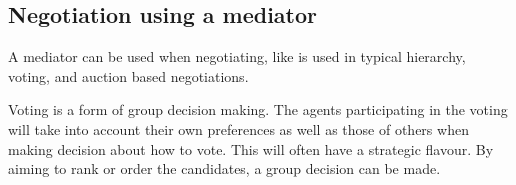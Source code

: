 




\subsection{Negotiation using a mediator}
A mediator can be used when negotiating, like is used in typical hierarchy, voting, and auction based negotiations. 

Voting is a form of group decision making. The agents participating in the voting will take into account their own preferences as well as those of others when making decision about how to vote. This will often have a strategic flavour. By aiming to rank or order the candidates, a group decision can be made.

